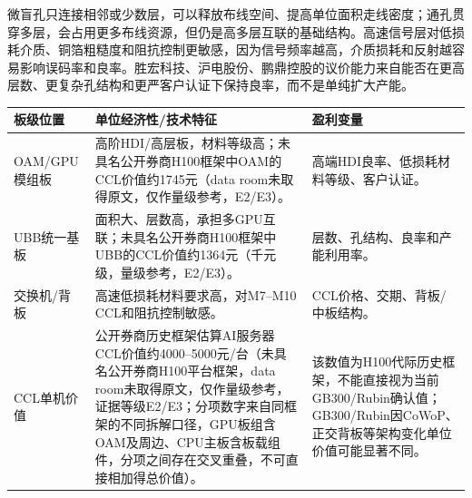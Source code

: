 \begin{exhibitbox}[图表3-5：HDI与高多层板层叠示意]
\end{exhibitbox}

微盲孔只连接相邻或少数层，可以释放布线空间、提高单位面积走线密度；通孔贯穿多层，会占用更多布线资源，但仍是高多层互联的基础结构。高速信号层对低损耗介质、铜箔粗糙度和阻抗控制更敏感，因为信号频率越高，介质损耗和反射越容易影响误码率和良率。胜宏科技、沪电股份、鹏鼎控股的议价能力来自能否在更高层数、更复杂孔结构和更严客户认证下保持良率，而不是单纯扩大产能。

\begin{exhibitbox}[图表3-6：AI服务器板级价值池和单位经济性]
\centering
\footnotesize
\begin{tabularx}{\textwidth}{L{2.6cm}X X}
\toprule
\textbf{板级位置} & \textbf{单位经济性/技术特征} & \textbf{盈利变量} \\
\midrule
OAM/GPU模组板 & 高阶HDI/高层板，材料等级高；未具名公开券商H100框架中OAM的CCL价值约1745元（data room未取得原文，仅作量级参考，E2/E3）。 & 高端HDI良率、低损耗材料等级、客户认证。 \\
UBB统一基板 & 面积大、层数高，承担多GPU互联；未具名公开券商H100框架中UBB的CCL价值约1364元（千元级，量级参考，E2/E3）。 & 层数、孔结构、良率和产能利用率。 \\
交换机/背板 & 高速低损耗材料要求高，对M7--M10 CCL和阻抗控制敏感。 & CCL价格、交期、背板/中板结构。 \\
CCL单机价值 & 公开券商历史框架估算AI服务器CCL价值约4000--5000元/台（未具名公开券商H100平台框架，data room未取得原文，仅作量级参考，证据等级E2/E3；分项数字来自同框架的不同拆解口径，GPU板组含OAM及周边、CPU主板含板载组件，分项之间存在交叉重叠，不可直接相加得总价值）。 & 该数值为H100代际历史框架，不能直接视为当前GB300/Rubin确认值；GB300/Rubin因CoWoP、正交背板等架构变化单位价值可能显著不同。 \\
\bottomrule
\end{tabularx}
\end{exhibitbox}

